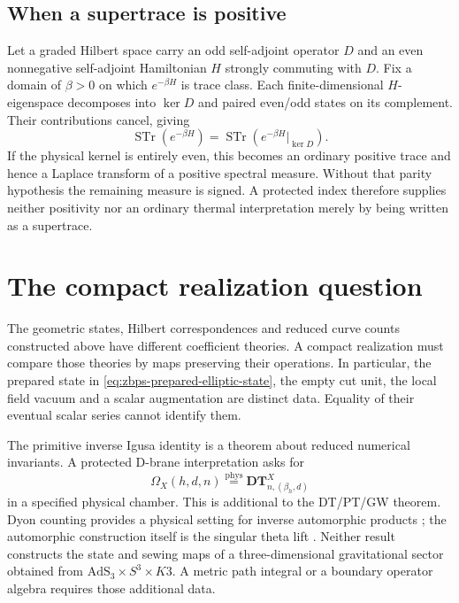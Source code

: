 \subsection{When a supertrace is positive}
\label{subsec:zbps-positive-supertrace}

Let a graded Hilbert space carry an odd self-adjoint operator
\(D\) and an even nonnegative self-adjoint Hamiltonian \(H\)
strongly commuting with \(D\).  Fix a domain of \(\beta>0\) on
which \(e^{-\beta H}\) is trace class.  Each finite-dimensional
\(H\)-eigenspace decomposes into \(\ker D\) and paired even/odd
states on its complement.  Their contributions cancel, giving
\[
 \operatorname{STr}(e^{-\beta H})
 =\operatorname{STr}(e^{-\beta H}|_{\ker D}).
\]
If the physical kernel is entirely even, this becomes an ordinary
positive trace and hence a Laplace transform of a positive
spectral measure.  Without that parity hypothesis the remaining
measure is signed.  A protected index therefore supplies neither
positivity nor an ordinary thermal interpretation merely by being
written as a supertrace.

\section{The compact realization question}
\label{sec:k3-e-threefold-realization}

The geometric states, Hilbert correspondences and reduced curve
counts constructed above have different coefficient theories.
A compact realization must compare those theories by maps
preserving their operations.  In particular, the prepared state
in \eqref{eq:zbps-prepared-elliptic-state}, the empty cut unit,
the local field vacuum and a scalar augmentation are distinct
data.  Equality of their eventual scalar series cannot identify
them.

\begin{scope}
\label{scope:zbps-no-3d-gravity}
The primitive inverse Igusa identity is a theorem about reduced
numerical invariants.  A protected D-brane interpretation asks for
\[
 \Omega_X(h,d,n)\stackrel{\mathrm{phys}}{=}
                 \mathbf{DT}^X_{n,(\beta_h,d)}
\]
in a specified physical chamber.  This is additional to the
DT/PT/GW theorem.  Dyon counting provides a physical setting for
inverse automorphic products \cite{DVV}; the automorphic
construction itself is the singular theta lift \cite{B}.
Neither result constructs the state and sewing maps of a
three-dimensional gravitational sector obtained from
\(\mathrm{AdS}_3\times S^3\times K3\).  A metric path integral
or a boundary operator algebra requires those additional data.
\end{scope}

